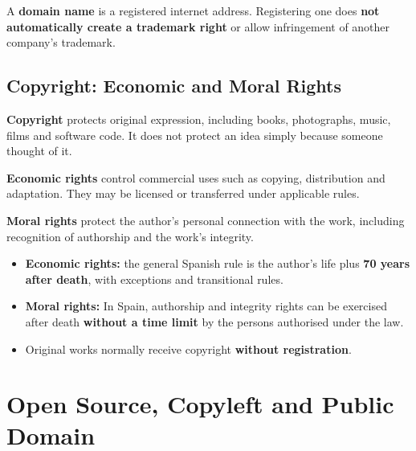 \documentclass[12pt,a4paper]{report}
\newcommand{\tightlist}{}
\begin{document}
A \textbf{domain name} is a registered internet address. Registering one does \textbf{not automatically create a trademark right} or allow infringement of another company's trademark.

\hypertarget{copyright-economic-and-moral-rights}{%
\subsection{Copyright: Economic and Moral Rights}\label{copyright-economic-and-moral-rights}}

\textbf{Copyright} protects original expression, including books, photographs, music, films and software code. It does not protect an idea simply because someone thought of it.

\textbf{Economic rights} control commercial uses such as copying, distribution and adaptation. They may be licensed or transferred under applicable rules.

\textbf{Moral rights} protect the author's personal connection with the work, including recognition of authorship and the work's integrity.

\begin{itemize}
\tightlist
\item
  \textbf{Economic rights:} the general Spanish rule is the author's life plus \textbf{70 years after death}, with exceptions and transitional rules.
\item
  \textbf{Moral rights:} In Spain, authorship and integrity rights can be exercised after death \textbf{without a time limit} by the persons authorised under the law.
\item
  Original works normally receive copyright \textbf{without registration}.
\end{itemize}

\hypertarget{open-source-copyleft-and-public-domain}{%
\section{Open Source, Copyleft and Public Domain}\label{open-source-copyleft-and-public-domain}}
\end{document}
